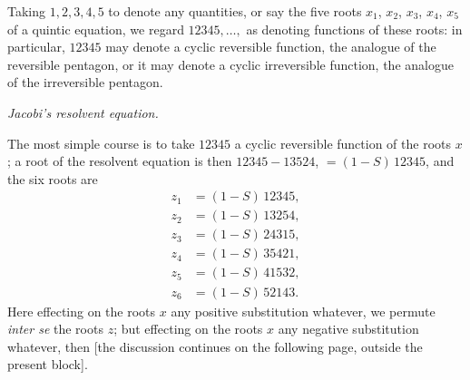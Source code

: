 \documentclass[11pt]{article}
\begin{document}
\medskip\noindent
Taking $1, 2, 3, 4, 5$ to denote any quantities, or say the five roots $x_{1}$, $x_{2}$, $x_{3}$, $x_{4}$, $x_{5}$ of a quintic equation, we regard $12345, \ldots,$ as denoting functions of these roots: in particular, $12345$ may denote a cyclic reversible function, the analogue of the reversible pentagon, or it may denote a cyclic irreversible function, the analogue of the irreversible pentagon.

\medskip
\begin{center}\textit{Jacobi's resolvent equation.}\end{center}

\medskip\noindent
The most simple course is to take $12345$ a cyclic reversible function of the roots $x$; a root of the resolvent equation is then $12345 - 13524$, $= (1 - S)\,12345$, and the six roots are
\[
\begin{aligned}
z_{1} &= (1 - S)\,12345, \\
z_{2} &= (1 - S)\,13254, \\
z_{3} &= (1 - S)\,24315, \\
z_{4} &= (1 - S)\,35421, \\
z_{5} &= (1 - S)\,41532, \\
z_{6} &= (1 - S)\,52143.
\end{aligned}
\]
Here effecting on the roots $x$ any positive substitution whatever, we permute \textit{inter se} the roots $z$; but effecting on the roots $x$ any negative substitution whatever, then [the discussion continues on the following page, outside the present block].
\end{document}
